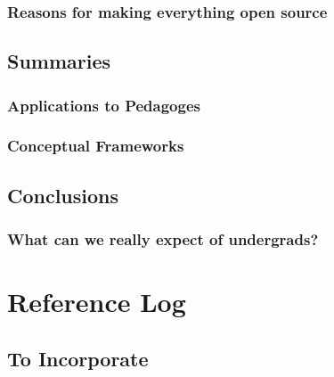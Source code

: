 \documentclass[]{book}
\theoremstyle{definition}
\theoremstyle{definition}
\theoremstyle{definition}
\theoremstyle{remark}
\begin{document}
\hypertarget{reasons-for-making-everything-open-source}{%
\subsection{Reasons for making everything open
source}\label{reasons-for-making-everything-open-source}}

\hypertarget{summaries}{%
\section{Summaries}\label{summaries}}

\hypertarget{applications-to-pedagoges}{%
\subsection{Applications to Pedagoges}\label{applications-to-pedagoges}}

\hypertarget{conceptual-frameworks}{%
\subsection{Conceptual Frameworks}\label{conceptual-frameworks}}

\hypertarget{conclusions}{%
\section{Conclusions}\label{conclusions}}

\hypertarget{what-can-we-really-expect-of-undergrads}{%
\subsection{What can we really expect of
undergrads?}\label{what-can-we-really-expect-of-undergrads}}

\hypertarget{reference-log}{%
\chapter{Reference Log}\label{reference-log}}

\hypertarget{to-incorporate}{%
\section{To Incorporate}\label{to-incorporate}}
\end{document}
